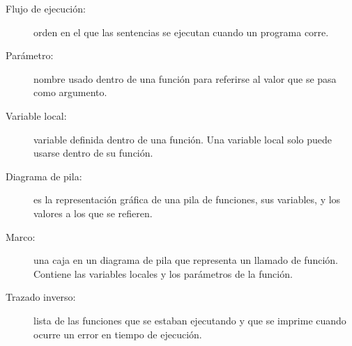 \begin{description}
\item[Flujo de ejecución:]  orden en el que las sentencias se ejecutan 
cuando un programa corre.

\item[Parámetro:]  nombre usado dentro de una función para referirse al valor
que se pasa como argumento.

\item[Variable local:]  variable definida dentro de una función.  Una
variable local solo puede usarse dentro de su función.

\item[Diagrama de pila:]  es la representación gráfica de una pila de  funciones,
sus variables, y los valores a los que se refieren.

\item[Marco:]  una caja en un diagrama de pila que representa un llamado de función.
Contiene las variables locales y los parámetros de la función.

\item[Trazado inverso:]  lista de las funciones que se estaban ejecutando y que se
imprime cuando ocurre un error en tiempo de ejecución.


\end{description}


